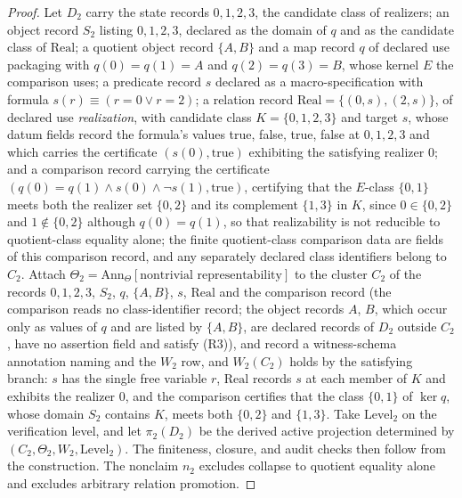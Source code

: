\begin{proof}
Let \(D_2\) carry the state records \(0,1,2,3\), the candidate class of
realizers; an object record \(S_2\) listing \(0,1,2,3\), declared as the domain
of \(q\) and as the candidate class of \(\mathrm{Real}\); a quotient object record \(\{A,B\}\) and a map record \(q\) of
declared use packaging with \(q(0)=q(1)=A\) and \(q(2)=q(3)=B\), whose kernel
\(E\) the comparison uses; a predicate record \(s\) declared as a
macro-specification with formula \(s(r)\equiv(r=0\lor r=2)\); a relation record
\(\mathrm{Real}=\{(0,s),(2,s)\}\), of declared use \emph{realization}, with
candidate class \(K=\{0,1,2,3\}\) and target \(s\),
whose datum fields record the formula's values true, false, true, false at \(0,1,2,3\) and which carries
the certificate \((s(0),\mathrm{true})\) exhibiting the satisfying realizer
\(0\); and a comparison record carrying the certificate
\((q(0)=q(1)\wedge s(0)\wedge\neg s(1),\mathrm{true})\), certifying that the
\(E\)-class \(\{0,1\}\) meets both the realizer set \(\{0,2\}\) and its
complement \(\{1,3\}\) in \(K\), since \(0\in\{0,2\}\) and \(1\notin\{0,2\}\)
although \(q(0)=q(1)\), so that
realizability is not reducible to quotient-class equality alone; the finite quotient-class comparison data are
fields of this comparison record, and any separately declared class
identifiers belong to \(C_2\). Attach
\(\Theta_2 = \mathrm{Ann}_\Theta[\text{nontrivial representability}]\)
to the cluster \(C_2\) of the records \(0,1,2,3\), \(S_2\), \(q\), \(\{A,B\}\), \(s\), \(\mathrm{Real}\) and the comparison record (the comparison reads no class-identifier record; the object records \(A\), \(B\), which occur only as values of \(q\) and are listed by \(\{A,B\}\), are declared records of \(D_2\) outside \(C_2\), have no assertion field and satisfy (R3)), and record a witness-schema annotation naming \Ptwo{} and the \(W_2\) row,
and \(W_2(C_2)\) holds by the satisfying branch: \(s\) has the single free
variable \(r\), \(\mathrm{Real}\) records \(s\) at each member of \(K\) and
exhibits the realizer \(0\), and the comparison certifies that the class
\(\{0,1\}\) of \(\ker q\), whose domain \(S_2\) contains \(K\), meets both
\(\{0,2\}\) and \(\{1,3\}\). Take
\(\mathrm{Level}_2\) on the verification level, and let \(\pi_2(D_2)\)
be the derived active projection determined by
\((C_2,\Theta_2,W_2,\mathrm{Level}_2)\). The finiteness, closure, and
audit checks then follow from the construction. The
nonclaim \(n_2\) excludes collapse to \Pfive{} quotient equality alone
and excludes arbitrary relation promotion.
\end{proof}

